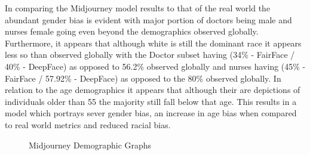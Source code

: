 In comparing the Midjourney model results to that of the real world the abundant gender bias is evident with major portion of doctors being male and nurses female going even beyond the demographics observed globally. Furthermore, it appears that although white is still the dominant race it appears less so than observed globally with the Doctor subset having (34\% - FairFace / 40\% - DeepFace) as opposed to 56.2\% observed globally and nurses having (45\% - FairFace / 57.92\% - DeepFace) as opposed to the 80\% observed globally. In relation to the age demographics it appears that although their are depictions of individuals older than 55 the majority still fall below that age. This results in a model which portrays sever gender bias, an increase in age bias when compared to real world metrics and reduced racial bias. 

\begin{figure}[H]
\centering  
{}

\caption{Midjourney Demographic Graphs}\label{fig:Midjourney-Demographic-Graphs}
\end{figure}

